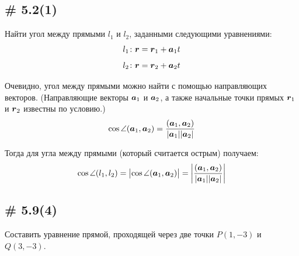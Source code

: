 \documentclass[a4paper,12pt]{article}
\begin{document}
  
  \subsection{\# 5.2(1)}
  
  \begin{problem}
    Найти угол между прямыми $l_1$ и $l_2$, заданными следующими уравнениями:
    \[
      l_1\colon \boldsymbol r = \boldsymbol r_1 + \boldsymbol a_1 t
    \]
    \[
      l_2\colon \boldsymbol r = \boldsymbol r_2 + \boldsymbol a_2 t
    \]
  \end{problem}
  
  \begin{solution}
    Очевидно, угол между прямыми можно найти с помощью направляющих векторов.
    (Направляющие векторы $\boldsymbol a_1$ и $\boldsymbol a_2$, а также начальные точки прямых $\boldsymbol r_1$ и $\boldsymbol r_2$ известны по условию.)
    \[
      \cos \angle (\boldsymbol a_1, \boldsymbol a_2) = \frac{(\boldsymbol a_1, \boldsymbol a_2)}{|\boldsymbol a_1| |\boldsymbol a_2|}
    \]
    
    Тогда для угла между прямыми (который считается острым) получаем:
    \[
      \cos \angle (l_1, l_2) = \bigl|\cos \angle (\boldsymbol a_1, \boldsymbol a_2)\bigr| = \left| \frac{(\boldsymbol a_1, \boldsymbol a_2)}{|\boldsymbol a_1| |\boldsymbol a_2|} \right|
    \]
  \end{solution}
  
  
  \subsection{\# 5.9(4)}
  
  \begin{problem}
    Составить уравнение прямой, проходящей через две точки $P(1, -3)$ и $Q(3, -3)$.
  \end{problem}
  
\end{document}
